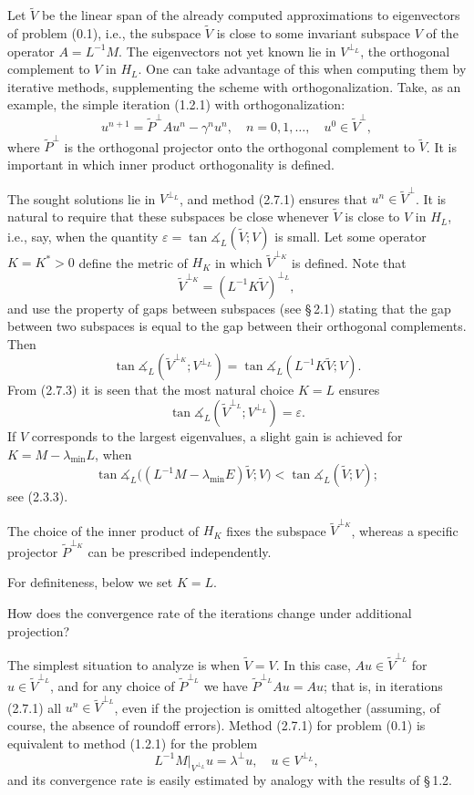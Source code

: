 \documentclass[11pt,oneside]{book}
\newcommand{\ang}{\measuredangle}
\begin{document}
Let $\widetilde{V}$ be the linear span of the already computed approximations to eigenvectors of problem (0.1), i.e., the subspace $\widetilde{V}$ is close to some invariant subspace $V$ of the operator $A = L^{-1}M$. The eigenvectors not yet known lie in $V^{\perp_L}$, the orthogonal complement to $V$ in $H_L$. One can take advantage of this when computing them by iterative methods, supplementing the scheme with orthogonalization. Take, as an example, the simple iteration (1.2.1) with orthogonalization:
\[
u^{n+1} = \widetilde{P}^\perp A u^n - \gamma^n u^n, \quad n = 0, 1, \ldots, \quad u^0 \in \widetilde{V}^\perp, \tag{2.7.1}
\]
where $\widetilde{P}^\perp$ is the orthogonal projector onto the orthogonal complement to $\widetilde{V}$. It is important in which inner product orthogonality is defined.

The sought solutions lie in $V^{\perp_L}$, and method (2.7.1) ensures that $u^n \in \widetilde{V}^\perp$. It is natural to require that these subspaces be close whenever $\widetilde{V}$ is close to $V$ in $H_L$, i.e., say, when the quantity $\varepsilon = \tan \ang_L(\widetilde{V}; V)$ is small. Let some operator $K = K^* > 0$ define the metric of $H_K$ in which $\widetilde{V}^{\perp_K}$ is defined. Note that
\[
\widetilde{V}^{\perp_K} = (L^{-1} K \widetilde{V})^{\perp_L}, \tag{2.7.2}
\]
and use the property of gaps between subspaces (see \S\,2.1) stating that the gap between two subspaces is equal to the gap between their orthogonal complements. Then
\[
\tan \ang_L(\widetilde{V}^{\perp_K}; V^{\perp_L}) = \tan \ang_L(L^{-1} K \widetilde{V}; V). \tag{2.7.3}
\]
From (2.7.3) it is seen that the most natural choice $K = L$ ensures
\[
\tan \ang_L(\widetilde{V}^{\perp_L}; V^{\perp_L}) = \varepsilon. \tag{2.7.4}
\]
If $V$ corresponds to the largest eigenvalues, a slight gain is achieved for $K = M - \lambda_{\min} L$, when
\[
\tan \ang_L\bigl((L^{-1}M - \lambda_{\min} E)\widetilde{V}; V\bigr) < \tan \ang_L(\widetilde{V}; V);
\]
see (2.3.3).

The choice of the inner product of $H_K$ fixes the subspace $\widetilde{V}^{\perp_K}$, whereas a specific projector $\widetilde{P}^{\perp_K}$ can be prescribed independently.

For definiteness, below we set $K = L$.

How does the convergence rate of the iterations change under additional projection?

The simplest situation to analyze is when $\widetilde{V} = V$. In this case, $A u \in \widetilde{V}^{\perp_L}$ for $u \in \widetilde{V}^{\perp_L}$, and for any choice of $\widetilde{P}^{\perp_L}$ we have $\widetilde{P}^{\perp_L} A u = A u$; that is, in iterations (2.7.1) all $u^n \in \widetilde{V}^{\perp_L}$, even if the projection is omitted altogether (assuming, of course, the absence of roundoff errors). Method (2.7.1) for problem (0.1) is equivalent to method (1.2.1) for the problem
\[
L^{-1}M\big|_{V^{\perp_L}} u = \lambda^\perp u, \quad u \in V^{\perp_L}, \tag{2.7.5}
\]
and its convergence rate is easily estimated by analogy with the results of \S\,1.2.
\end{document}
